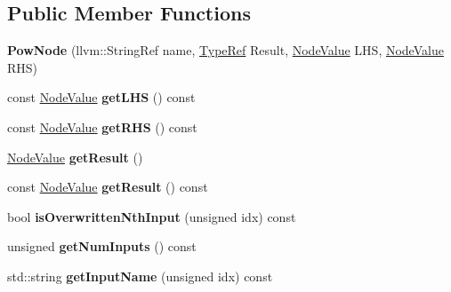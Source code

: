 \subsection*{Public Member Functions}
\begin{DoxyCompactItemize}
\item 
\mbox{\label{classglow_1_1_pow_node_a516840cce51194f02946a8a22b3c914e}} 
{\bfseries Pow\+Node} (llvm\+::\+String\+Ref name, \hyperlink{structglow_1_1_type}{Type\+Ref} Result, \hyperlink{structglow_1_1_node_value}{Node\+Value} L\+HS, \hyperlink{structglow_1_1_node_value}{Node\+Value} R\+HS)
\item 
\mbox{\label{classglow_1_1_pow_node_adf6755a3cea1e8c1261b3cbea3342bfe}} 
const \hyperlink{structglow_1_1_node_value}{Node\+Value} {\bfseries get\+L\+HS} () const
\item 
\mbox{\label{classglow_1_1_pow_node_af159259d8ced990dd49e0800d0a9ecc9}} 
const \hyperlink{structglow_1_1_node_value}{Node\+Value} {\bfseries get\+R\+HS} () const
\item 
\mbox{\label{classglow_1_1_pow_node_a073a2062a4f26a97680eb0d08a1f6b78}} 
\hyperlink{structglow_1_1_node_value}{Node\+Value} {\bfseries get\+Result} ()
\item 
\mbox{\label{classglow_1_1_pow_node_aed7205ad1b3256b8e349109ac6fbc33a}} 
const \hyperlink{structglow_1_1_node_value}{Node\+Value} {\bfseries get\+Result} () const
\item 
\mbox{\label{classglow_1_1_pow_node_a5ae8b6fe8c8ff6aadd4e6ea1fd9007dc}} 
bool {\bfseries is\+Overwritten\+Nth\+Input} (unsigned idx) const
\item 
\mbox{\label{classglow_1_1_pow_node_ad3043db1e7bc2b3767d15a73fb3d5e73}} 
unsigned {\bfseries get\+Num\+Inputs} () const
\item 
\mbox{\label{classglow_1_1_pow_node_ae0f65b9e85f84a0ef60f13bc8888603b}} 
std\+::string {\bfseries get\+Input\+Name} (unsigned idx) const
\item 
\mbox{\label{classglow_1_1_pow_node_a3ffb1ad9d5fe4e6438e01f4ea6c35162}} 

\end{DoxyCompactItemize}
